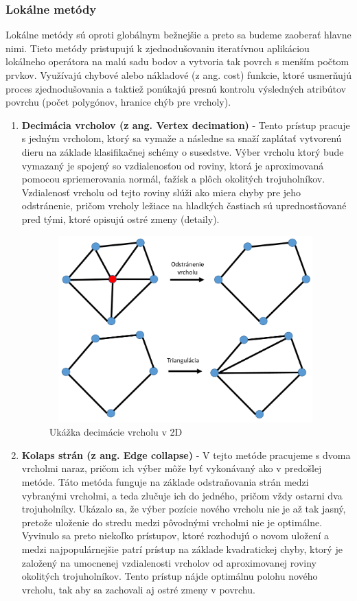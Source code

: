 \subsubsection{Lokálne metódy}
\noindent Lokálne metódy sú oproti globálnym bežnejšie a preto sa budeme zaoberať hlavne nimi. Tieto metódy pristupujú k zjednodušovaniu iteratívnou aplikáciou lokálneho operátora na malú sadu bodov a vytvoria tak povrch s menším počtom prvkov. Využívajú chybové alebo nákladové (z ang. cost)  funkcie, ktoré usmerňujú proces zjednodušovania a taktiež ponúkajú presnú kontrolu výsledných atribútov povrchu (počet polygónov, hranice chýb pre vrcholy). \cite{mesh_simplification}
\begin{enumerate}
    \item\textbf{Decimácia vrcholov (z ang. Vertex decimation)} - Tento prístup pracuje s jedným vrcholom, ktorý sa vymaže a následne sa snaží zaplátať vytvorenú dieru na základe klasifikačnej schémy o susedstve. Výber vrcholu ktorý bude vymazaný je spojený so  vzdialenosťou od roviny, ktorá je aproximovaná pomocou spriemerovania normál, ťažísk a plôch okolitých trojuholníkov. Vzdialenosť vrcholu od tejto roviny slúži ako miera chyby pre jeho odstránenie, pričom vrcholy ležiace na hladkých častiach sú uprednostňované pred tými, ktoré opisujú ostré zmeny (detaily). \cite{mesh_simplification}
    \begin{figure}[!htbp]
      \centering
      \includegraphics[width=10.5cm, height=7.2cm]{img/vertex_decim.png}
      \caption{Ukážka decimácie vrcholu v 2D} 
      \label{fig:vertex_decim}
    \end{figure} 
    \item\textbf{Kolaps strán (z ang. Edge collapse)} - V tejto metóde pracujeme s dvoma vrcholmi naraz, pričom ich výber môže byť vykonávaný ako v predošlej metóde. Táto metóda funguje na základe odstraňovania strán medzi vybranými vrcholmi, a teda zlučuje ich do jedného, pričom vždy ostarni dva trojuholníky. Ukázalo sa, že výber pozície nového vrcholu nie je až tak jasný, pretože uloženie do stredu medzi pôvodnými vrcholmi nie je optimálne. Vyvinulo sa preto niekoľko prístupov, ktoré rozhodujú o novom uložení a medzi najpopulárnejšie patrí  prístup na základe kvadratickej chyby, ktorý je založený na umocnenej vzdialenosti vrcholov od aproximovanej roviny okolitých trojuholníkov. Tento prístup nájde optimálnu polohu nového vrcholu, tak aby sa zachovali aj ostré zmeny v povrchu.

\end{enumerate}

